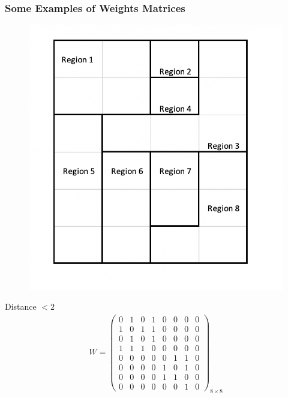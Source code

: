 \documentclass[
  shownotes,
  xcolor={svgnames},
  hyperref={colorlinks,citecolor=DarkBlue,linkcolor=DarkRed,urlcolor=DarkBlue}
   , aspectratio=169]{beamer}
\begin{document}
\begin{frame}[fragile]
\frametitle{Some Examples of Weights Matrices}


\begin{minipage}[t]{0.53\linewidth}
  \begin{figure}[H] \centering
    \captionsetup{justification=centering}
    \includegraphics[scale=0.6]{figures/regions_example}
   \end{figure}
  
    \end{minipage}
    \hfill
\begin{minipage}[t]{0.43\linewidth}%
\scriptsize
Distance $<2$
\begin{align}
W=\left(\begin{array}{cccccccc}
0 & 1 & 0 & 1 & 0 & 0 & 0 & 0\\
1 & 0 & 1 & 1 & 0 & 0 & 0 & 0\\
0 & 1 & 0 & 1 & 0 & 0 & 0 & 0\\
1 & 1 & 1 & 0 & 0 & 0 & 0 & 0\\
0 & 0 & 0 & 0 & 0 & 1 & 1 & 0\\
0 & 0 & 0 & 0 & 1 & 0 & 1 & 0\\
0 & 0 & 0 & 0 & 1 & 1 & 0 & 0\\
0 & 0 & 0 & 0 & 0 & 0 & 1 & 0
\end{array}\right)_{8\times8} \nonumber
\end{align}
\end{minipage}

\end{frame}
\end{document}
